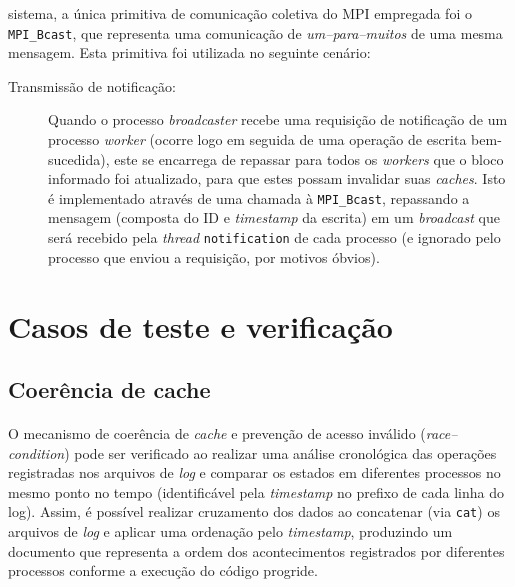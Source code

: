\documentclass[12pt]{article}
\begin{document}
\begin{description}
    sistema, a única primitiva de comunicação coletiva do MPI empregada foi o \texttt{MPI\_Bcast}, que representa uma
    comunicação de \textit{um--para--muitos} de uma mesma mensagem. Esta primitiva foi utilizada no seguinte cenário:
    \begin{description}
      \item[Transmissão de notificação:] Quando o processo \textit{broadcaster} recebe uma requisição de notificação de
        um processo \textit{worker} (ocorre logo em seguida de uma operação de escrita bem-sucedida), este se encarrega
        de repassar para todos os \textit{workers} que o bloco informado foi atualizado, para que estes possam invalidar
        suas \textit{caches}. Isto é implementado através de uma chamada à \texttt{MPI\_Bcast}, repassando a mensagem
        (composta do ID e \textit{timestamp} da escrita) em um \textit{broadcast} que será recebido pela \textit{thread}
        \texttt{notification} de cada processo (e ignorado pelo processo que enviou a requisição, por motivos óbvios).
    \end{description}
\end{description}

\section{Casos de teste e verificação}
\subsection{Coerência de cache}
\paragraph{}
O mecanismo de coerência de \textit{cache} e prevenção de acesso inválido (\textit{race--condition}) pode ser verificado
ao realizar uma análise cronológica das operações registradas nos arquivos de \textit{log} e comparar os estados em
diferentes processos no mesmo ponto no tempo (identificável pela \textit{timestamp} no prefixo de cada linha do log).
Assim, é possível realizar cruzamento dos dados ao concatenar (via \texttt{cat}) os arquivos de \textit{log} e aplicar
uma ordenação pelo \textit{timestamp}, produzindo um documento que representa a ordem dos acontecimentos registrados por
diferentes processos conforme a execução do código progride.
\end{document}
